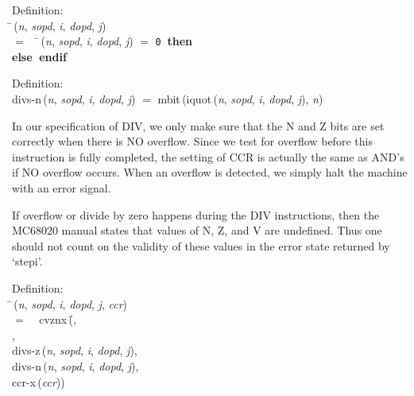 \begin{tabbing}{\sc Definition}: \\  
\=\,({\it{n\/}}, {\it{sopd\/}}, {\it{i\/}}, {\it{dopd\/}}, {\it{j\/}}) \\ 
$=$$\;\;\;\;$\=\,({\it{n\/}}, {\it{sopd\/}}, {\it{i\/}}, {\it{dopd\/}}, {\it{j\/}}) $=$ {\tt{0}}$\;\;${\bf then }{} \\ 
{\bf else }{}$\;${\bf  endif}\-\-
\end{tabbing}

\begin{tabbing}{\sc Definition}: \\  
{\rm{divs-n}}\,({\it{n\/}}, {\it{sopd\/}}, {\it{i\/}}, {\it{dopd\/}}, {\it{j\/}}) $=$ {\rm{mbit}}\,({\rm{iquot}}\,({\it{n\/}}, {\it{sopd\/}}, {\it{i\/}}, {\it{dopd\/}}, {\it{j\/}}), {\it{n\/}})
\end{tabbing}

 In our specification of DIV,  we only make sure that the N and Z bits 
 are set correctly when there is NO overflow.
 Since we test for overflow before this instruction is fully completed,
 the setting of CCR is actually the same as AND's if NO overflow occurs.
 When an overflow is detected, we simply halt the machine with an
 error signal.

 If overflow or divide by zero happens during the DIV instructions, then
 the MC68020 manual states that values of N, Z, and V are undefined.
 Thus one should not count on the validity of these values in the
 error state returned by `stepi'.

\begin{tabbing}{\sc Definition}: \\  
\=\,({\it{n\/}}, {\it{sopd\/}}, {\it{i\/}}, {\it{dopd\/}}, {\it{j\/}}, {\it{ccr\/}}) \\ 
$=$$\;\;\;\;${\rm{cvznx}}\,(\=, \\ 
{}, \\ 
{\rm{divs-z}}\,({\it{n\/}}, {\it{sopd\/}}, {\it{i\/}}, {\it{dopd\/}}, {\it{j\/}}), \\ 
{\rm{divs-n}}\,({\it{n\/}}, {\it{sopd\/}}, {\it{i\/}}, {\it{dopd\/}}, {\it{j\/}}), \\ 
{\rm{ccr-x}}\,({\it{ccr\/}}))\-\-
\end{tabbing}

